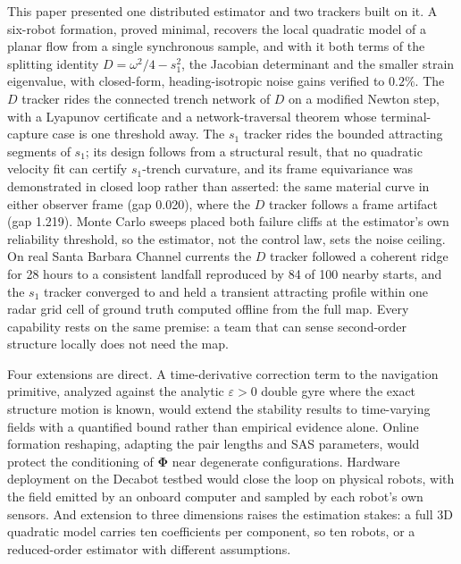 \documentclass[lettersize,journal]{IEEEtran}
\begin{document}
This paper presented one distributed estimator and two trackers built
on it. A six-robot formation, proved minimal, recovers the local
quadratic model of a planar flow from a single synchronous sample, and
with it both terms of the splitting identity $D = \omega^2/4 - s_1^2$,
the Jacobian determinant and the smaller strain eigenvalue, with
closed-form, heading-isotropic noise gains verified to $0.2\%$. The
$D$ tracker rides the connected trench network of $D$ on a
modified Newton step, with a Lyapunov certificate and a
network-traversal theorem whose terminal-capture case is one threshold
away. The $s_1$ tracker rides the bounded attracting segments of $s_1$;
its design follows from a structural result, that no quadratic velocity
fit can certify $s_1$-trench curvature, and its frame equivariance was
demonstrated in closed loop rather than asserted: the same material
curve in either observer frame (gap 0.020), where the $D$ tracker
follows a frame artifact (gap 1.219). Monte Carlo sweeps placed both
failure cliffs at the estimator's own reliability threshold, so the
estimator, not the control law, sets the noise ceiling. On real Santa
Barbara Channel currents the $D$ tracker followed a coherent
ridge for 28 hours to a consistent landfall reproduced by 84 of 100
nearby starts, and the $s_1$ tracker converged to and held a transient
attracting profile within one radar grid cell of ground truth computed
offline from the full map. Every capability rests on the same premise:
a team that can sense second-order structure locally does not need the
map.

Four extensions are direct. A time-derivative correction term to the
navigation primitive, analyzed against the analytic $\varepsilon > 0$
double gyre where the exact structure motion is known, would extend
the stability results to time-varying fields with a quantified bound
rather than empirical evidence alone. Online formation reshaping,
adapting the pair lengths and SAS parameters, would protect the
conditioning of $\boldsymbol{\Phi}$ near degenerate configurations.
Hardware deployment on the Decabot testbed would close the loop on
physical robots, with the field emitted by an onboard computer and
sampled by each robot's own sensors. And extension to three
dimensions raises the estimation stakes: a full 3D quadratic model
carries ten coefficients per component, so ten robots, or a
reduced-order estimator with different assumptions.


\appendices

\end{document}
